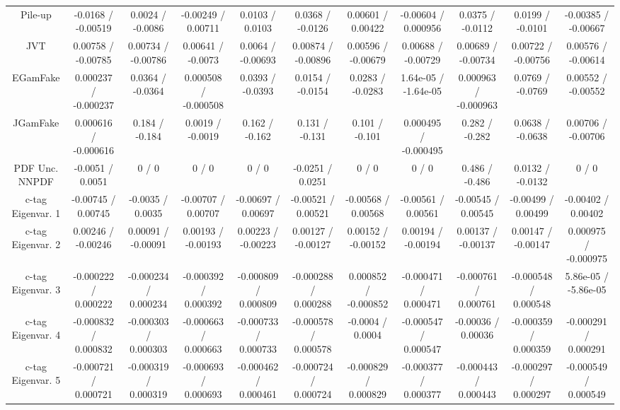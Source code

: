 \begin{table}[htbp]
\begin{center}
\begin{tabular}{|c|c|c|c|c|c|c|c|c|c|c|}
  Pile-up & -0.0168 / -0.00519 & 0.0024 / -0.0086 & -0.00249 / 0.00711 & 0.0103 / 0.0103 & 0.0368 / -0.0126 & 0.00601 / 0.00422 & -0.00604 / 0.000956 & 0.0375 / -0.0112 & 0.0199 / -0.0101 & -0.00385 / -0.00667 \\ 
  JVT & 0.00758 / -0.00785 & 0.00734 / -0.00786 & 0.00641 / -0.0073 & 0.0064 / -0.00693 & 0.00874 / -0.00896 & 0.00596 / -0.00679 & 0.00688 / -0.00729 & 0.00689 / -0.00734 & 0.00722 / -0.00756 & 0.00576 / -0.00614 \\ 
  EGamFake & 0.000237 / -0.000237 & 0.0364 / -0.0364 & 0.000508 / -0.000508 & 0.0393 / -0.0393 & 0.0154 / -0.0154 & 0.0283 / -0.0283 & 1.64e-05 / -1.64e-05 & 0.000963 / -0.000963 & 0.0769 / -0.0769 & 0.00552 / -0.00552 \\ 
  JGamFake & 0.000616 / -0.000616 & 0.184 / -0.184 & 0.0019 / -0.0019 & 0.162 / -0.162 & 0.131 / -0.131 & 0.101 / -0.101 & 0.000495 / -0.000495 & 0.282 / -0.282 & 0.0638 / -0.0638 & 0.00706 / -0.00706 \\ 
  PDF Unc. NNPDF & -0.0051 / 0.0051 & 0 / 0 & 0 / 0 & 0 / 0 & -0.0251 / 0.0251 & 0 / 0 & 0 / 0 & 0.486 / -0.486 & 0.0132 / -0.0132 & 0 / 0 \\ 
  c-tag Eigenvar. 1 & -0.00745 / 0.00745 & -0.0035 / 0.0035 & -0.00707 / 0.00707 & -0.00697 / 0.00697 & -0.00521 / 0.00521 & -0.00568 / 0.00568 & -0.00561 / 0.00561 & -0.00545 / 0.00545 & -0.00499 / 0.00499 & -0.00402 / 0.00402 \\ 
  c-tag Eigenvar. 2 & 0.00246 / -0.00246 & 0.00091 / -0.00091 & 0.00193 / -0.00193 & 0.00223 / -0.00223 & 0.00127 / -0.00127 & 0.00152 / -0.00152 & 0.00194 / -0.00194 & 0.00137 / -0.00137 & 0.00147 / -0.00147 & 0.000975 / -0.000975 \\ 
  c-tag Eigenvar. 3 & -0.000222 / 0.000222 & -0.000234 / 0.000234 & -0.000392 / 0.000392 & -0.000809 / 0.000809 & -0.000288 / 0.000288 & 0.000852 / -0.000852 & -0.000471 / 0.000471 & -0.000761 / 0.000761 & -0.000548 / 0.000548 & 5.86e-05 / -5.86e-05 \\ 
  c-tag Eigenvar. 4 & -0.000832 / 0.000832 & -0.000303 / 0.000303 & -0.000663 / 0.000663 & -0.000733 / 0.000733 & -0.000578 / 0.000578 & -0.0004 / 0.0004 & -0.000547 / 0.000547 & -0.00036 / 0.00036 & -0.000359 / 0.000359 & -0.000291 / 0.000291 \\ 
  c-tag Eigenvar. 5 & -0.000721 / 0.000721 & -0.000319 / 0.000319 & -0.000693 / 0.000693 & -0.000462 / 0.000461 & -0.000724 / 0.000724 & -0.000829 / 0.000829 & -0.000377 / 0.000377 & -0.000443 / 0.000443 & -0.000297 / 0.000297 & -0.000549 / 0.000549 \\ 

\end{tabular}
\end{center}
\end{table}
